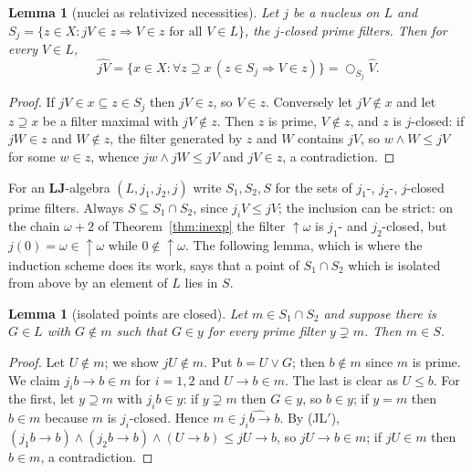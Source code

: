 \documentclass[11pt]{amsart}
\newtheorem{lem}[thm]{Lemma}
\theoremstyle{definition}
\newcommand{\LLJ}{\mathbf{LJ}}
\newcommand{\lax}{\bigcirc}
\begin{document}
\begin{lem}[nuclei as relativized necessities]\label{lem:rep}
Let $j$ be a nucleus on $L$ and $S_j=\{z\in X: jV\in z\Rightarrow V\in z\text{ for all }V\in L\}$,
the \emph{$j$-closed} prime filters. Then for every $V\in L$,
\[
\widehat{jV}=\{x\in X:\forall z\supseteq x\,(z\in S_j\Rightarrow V\in z)\}=\lax_{S_j}\hat V .
\]
\end{lem}
\begin{proof}
If $jV\in x\subseteq z\in S_j$ then $jV\in z$, so $V\in z$. Conversely let
$jV\notin x$ and let $z\supseteq x$ be a filter maximal with $jV\notin z$. Then
$z$ is prime, $V\notin z$, and $z$ is $j$-closed: if $jW\in z$ and $W\notin z$,
the filter generated by $z$ and $W$ contains $jV$, so $w\wedge W\le jV$ for
some $w\in z$, whence $jw\wedge jW\le jV$ and $jV\in z$, a contradiction.
\end{proof}

For an $\LLJ$-algebra $(L,j_1,j_2,j)$ write $S_1,S_2,S$ for the sets of
$j_1$-, $j_2$-, $j$-closed prime filters. Always $S\subseteq S_1\cap S_2$, since
$j_iV\le jV$; the inclusion can be strict: on the chain $\omega+2$ of
Theorem~\ref{thm:inexp} the filter $\uparrow\!\omega$ is $j_1$- and
$j_2$-closed, but $j(0)=\omega\in\uparrow\!\omega$ while $0\notin\uparrow\!\omega$.
The following lemma, which is where the induction scheme does its work, says
that a point of $S_1\cap S_2$ which is isolated from above by an element of $L$
lies in $S$.

\begin{lem}[isolated points are closed]\label{lem:key}
Let $m\in S_1\cap S_2$ and suppose there is $G\in L$ with $G\notin m$ such that
$G\in y$ for every prime filter $y\supsetneq m$. Then $m\in S$.
\end{lem}
\begin{proof}
Let $U\notin m$; we show $jU\notin m$. Put $b=U\vee G$; then $b\notin m$ since
$m$ is prime. We claim $j_ib\to b\in m$ for $i=1,2$ and $U\to b\in m$. The
last is clear as $U\le b$. For the first, let $y\supseteq m$ with $j_ib\in y$:
if $y\supsetneq m$ then $G\in y$, so $b\in y$; if $y=m$ then $b\in m$ because
$m$ is $j_i$-closed. Hence $m\in\widehat{j_ib\to b}$. By (JL$'$),
$(j_1b\to b)\wedge(j_2b\to b)\wedge(U\to b)\le jU\to b$, so $jU\to b\in m$;
if $jU\in m$ then $b\in m$, a contradiction.
\end{proof}
\end{document}
